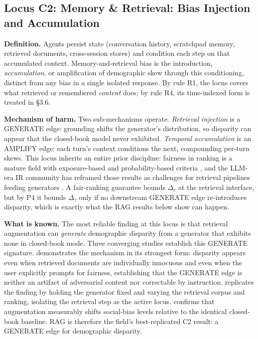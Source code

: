 \documentclass[acmsmall,nonacm]{acmart}
\begin{document}
\subsection{Locus C2: Memory \& Retrieval: Bias Injection and Accumulation}

\textbf{Definition.} Agents persist state (conversation history, scratchpad memory, retrieved documents, cross-session stores) and condition each step on that accumulated context. Memory-and-retrieval bias is the introduction, \emph{accumulation}, or amplification of demographic skew through this conditioning, distinct from any bias in a single isolated response. By rule R1, the locus covers what retrieved or remembered \emph{content} does; by rule R4, its time-indexed form is treated in \S{}3.6.

\textbf{Mechanism of harm.} Two sub-mechanisms operate. \emph{Retrieval injection} is a GENERATE edge: grounding shifts the generator's distribution, so disparity can appear that the closed-book model never exhibited. \emph{Temporal accumulation} is an AMPLIFY edge: each turn's context conditions the next, compounding per-turn skews. This locus inherits an entire prior discipline: fairness in ranking is a mature field with exposure-based and probability-based criteria \cite{zehlike2022fairness}, and the LLM-era IR community has reframed those results as challenges for retrieval pipelines feeding generators \cite{dai2024bias,dai2025trustworthy}. A fair-ranking guarantee bounds $\Delta_c$ at the retrieval interface, but by P4 it bounds $\Delta_\tau$ only if no downstream GENERATE edge re-introduces disparity, which is exactly what the RAG results below show can happen.

\textbf{What is known.} The most reliable finding at this locus is that retrieval augmentation can \emph{generate} demographic disparity from a generator that exhibits none in closed-book mode. Three converging studies establish this GENERATE signature. \cite{hu2024free} demonstrates the mechanism in its strongest form: disparity appears even when retrieved documents are individually innocuous and even when the user explicitly prompts for fairness, establishing that the GENERATE edge is neither an artifact of adversarial content nor correctable by instruction. \cite{wu2024rag} replicates the finding by holding the generator fixed and varying the retrieval corpus and ranking, isolating the retrieval step as the active locus. \cite{zhang2025evaluating} confirms that augmentation measurably shifts social-bias levels relative to the identical closed-book baseline. RAG is therefore the field's best-replicated C2 result: a GENERATE edge for demographic disparity.
\end{document}
